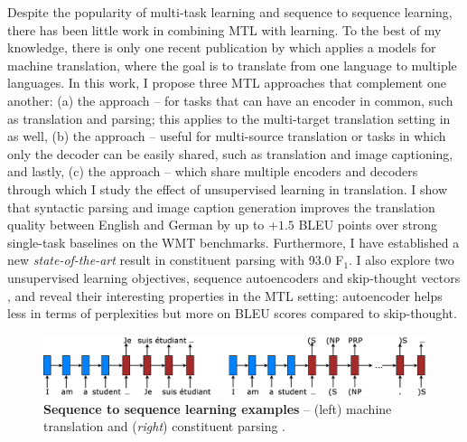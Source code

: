 Despite the popularity of multi-task learning and sequence to sequence
learning, there has been little work in combining MTL with \ssl{}
learning. To the best of my knowledge, there is only one recent
publication by  which applies a \ssl{} models for machine
translation, where the goal is to translate from one language to
multiple languages.
In this work, I propose three MTL
approaches that complement one another: (a) the {\it \otm} approach -- for
tasks that can have an encoder in common, such as translation and parsing; this 
applies to the multi-target translation setting in \cite{dong15} as well, (b)
the {\it \mto} approach -- useful for multi-source
translation or tasks in which only the decoder can be easily shared,
such as translation and image captioning, and lastly, (c) the {\it \mtm} approach -- which share
multiple encoders and decoders through which I study the effect of unsupervised
learning in translation.
I show
that syntactic parsing and image caption generation improves the
translation quality between English and German by up to +$1.5$ BLEU points over
strong single-task baselines on the WMT benchmarks. 
Furthermore, I have established a new {\it state-of-the-art} result in
constituent parsing with 93.0 F$_1$.
I also explore two unsupervised learning
objectives, sequence autoencoders \cite{dai15} and skip-thought vectors
\cite{kiros15skip}, and reveal their interesting properties in the MTL setting: autoencoder helps less in terms of
  perplexities but more on BLEU scores compared to skip-thought.
\begin{figure}%
\centering
\includegraphics[width=1\textwidth, clip=true, trim= 0 0 0
0]{img/6-1_seq2seq}
\caption[Sequence to sequence learning examples]{{\bf Sequence to sequence learning examples} -- (left) machine
translation \cite{sutskever14} and ({\it right}) constituent parsing
\cite{vinyals15grammar}.}
\label{f:s2s}
\end{figure}


